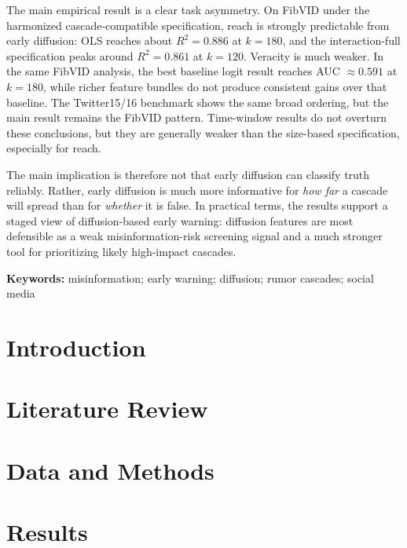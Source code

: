 \documentclass[11pt, titlepage]{article}
\newcommand{\keywords}{misinformation; early warning; diffusion; rumor cascades; social media}
\begin{document}
The main empirical result is a clear task asymmetry. On FibVID under the harmonized cascade-compatible specification, reach is strongly predictable from early diffusion: OLS reaches about $R^2=0.886$ at $k=180$, and the interaction-full specification peaks around $R^2=0.861$ at $k=120$. Veracity is much weaker. In the same FibVID analysis, the best baseline logit result reaches AUC $\approx 0.591$ at $k=180$, while richer feature bundles do not produce consistent gains over that baseline. The Twitter15/16 benchmark shows the same broad ordering, but the main result remains the FibVID pattern. Time-window results do not overturn these conclusions, but they are generally weaker than the size-based specification, especially for reach.

The main implication is therefore not that early diffusion can classify truth reliably. Rather, early diffusion is much more informative for \emph{how far} a cascade will spread than for \emph{whether} it is false. In practical terms, the results support a staged view of diffusion-based early warning: diffusion features are most defensible as a weak misinformation-risk screening signal and a much stronger tool for prioritizing likely high-impact cascades.

\bigskip
\noindent\textbf{Keywords:} \keywords

{\color{Gray}\noindent\hrulefill}

\newpage

\section{Introduction}
\label{intro}


\section{Literature Review}
\label{litreview}


\section{Data and Methods}
\label{datamethods}



\section{Results}
\label{results}

\end{document}
